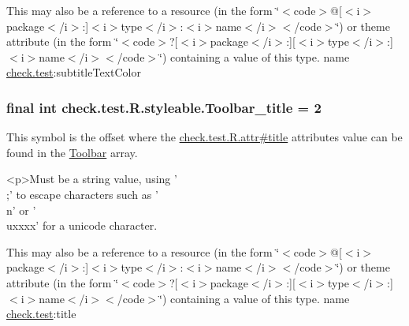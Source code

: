 This may also be a reference to a resource (in the form \char`\"{}$<$code$>$@\mbox{[}$<$i$>$package$<$/i$>$\+:\mbox{]}$<$i$>$type$<$/i$>$\+:$<$i$>$name$<$/i$>$$<$/code$>$\char`\"{}) or theme attribute (in the form \char`\"{}$<$code$>$?\mbox{[}$<$i$>$package$<$/i$>$\+:\mbox{]}\mbox{[}$<$i$>$type$<$/i$>$\+:\mbox{]}$<$i$>$name$<$/i$>$$<$/code$>$\char`\"{}) containing a value of this type.  name \hyperlink{namespacecheck_1_1test}{check.\+test}\+:subtitle\+Text\+Color \hypertarget{classcheck_1_1test_1_1_r_1_1styleable_a10fa1bd14d7aa843ac28da6df2e66b54}{}
\subsubsection[{Toolbar\+\_\+title}]{\setlength{\rightskip}{0pt plus 5cm}final int check.\+test.\+R.\+styleable.\+Toolbar\+\_\+title = 2\hspace{0.3cm}{\ttfamily [static]}}\label{classcheck_1_1test_1_1_r_1_1styleable_a10fa1bd14d7aa843ac28da6df2e66b54}
This symbol is the offset where the \hyperlink{classcheck_1_1test_1_1_r_1_1attr_a002c5907c5484ce9f870aa21ac099f9b}{check.\+test.\+R.\+attr\#title} attribute\textquotesingle{}s value can be found in the \hyperlink{classcheck_1_1test_1_1_r_1_1styleable_a1a7fa90223693abef77e7484cca2df54}{Toolbar} array.

\begin{DoxyVerb}      <p>Must be a string value, using '\\;' to escape characters such as '\\n' or '\\uxxxx' for a unicode character.
\end{DoxyVerb}
 

This may also be a reference to a resource (in the form \char`\"{}$<$code$>$@\mbox{[}$<$i$>$package$<$/i$>$\+:\mbox{]}$<$i$>$type$<$/i$>$\+:$<$i$>$name$<$/i$>$$<$/code$>$\char`\"{}) or theme attribute (in the form \char`\"{}$<$code$>$?\mbox{[}$<$i$>$package$<$/i$>$\+:\mbox{]}\mbox{[}$<$i$>$type$<$/i$>$\+:\mbox{]}$<$i$>$name$<$/i$>$$<$/code$>$\char`\"{}) containing a value of this type.  name \hyperlink{namespacecheck_1_1test}{check.\+test}\+:title \hypertarget{classcheck_1_1test_1_1_r_1_1styleable_a5e6ae0606eec219fca6a04beab67b4b3}{}
